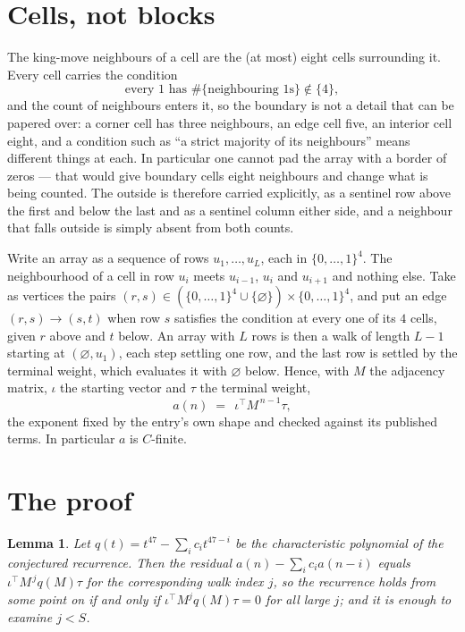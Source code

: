\documentclass[11pt,a4paper]{article}
\theoremstyle{plain}
\newtheorem{lemma}[theorem]{Lemma}
\theoremstyle{definition}
\begin{document}
\section{Cells, not blocks}

The king-move neighbours of a cell are the (at most) eight cells surrounding it. Every cell
carries the condition
\[
\text{every }1\text{ has }\#\{\text{neighbouring }1\text{s}\}\notin\{4\},
\]
and the count of neighbours enters it, so the boundary is not a detail that can be papered
over: a corner cell has three neighbours, an edge cell five, an interior cell eight, and a
condition such as ``a strict majority of its neighbours'' means different things at each. In
particular one cannot pad the array with a border of zeros --- that would give boundary cells
eight neighbours and change what is being counted. The outside is therefore carried
explicitly, as a sentinel row above the first and below the last and as a sentinel column
either side, and a neighbour that falls outside is simply absent from both counts.

Write an array as a sequence of rows $u_1,\dots,u_L$, each in
$\{0,\dots,1\}^{4}$. The neighbourhood of a cell in row $u_i$ meets $u_{i-1}$,
$u_i$ and $u_{i+1}$ and nothing else. Take as vertices the pairs
$(r,s)\in(\{0,\dots,1\}^{4}\cup\{\varnothing\})\times\{0,\dots,1\}^{4}$,
and put an edge $(r,s)\to(s,t)$ when row $s$ satisfies the condition at every one of its
$4$ cells, given $r$ above and $t$ below. An array with $L$ rows is then a walk of length
$L-1$ starting at $(\varnothing,u_1)$, each step settling one row, and the last row is
settled by the terminal weight, which evaluates it with $\varnothing$ below. Hence,
with $M$ the adjacency matrix, $\iota$ the starting vector and $\tau$ the terminal weight,
\[
a(n)\;=\;\,\iota^{\!\top}M^{\,n-1}\tau ,
\]
the exponent fixed by the entry's own shape and checked against its published terms. In
particular $a$ is $C$-finite.

\section{The proof}

\begin{lemma}\label{lem:crit}
Let $q(t)=t^{47}-\sum_i c_it^{47-i}$ be the characteristic polynomial of the
conjectured recurrence. Then the residual $a(n)-\sum_ic_ia(n-i)$ equals
$\iota^{\!\top}M^{\,j}q(M)\tau$ for the corresponding walk index $j$, so the
recurrence holds from some point on if and only if $\iota^{\!\top}M^{j}q(M)\tau=0$ for all
large $j$; and it is enough to examine $j<S$.
\end{lemma}
\end{document}
